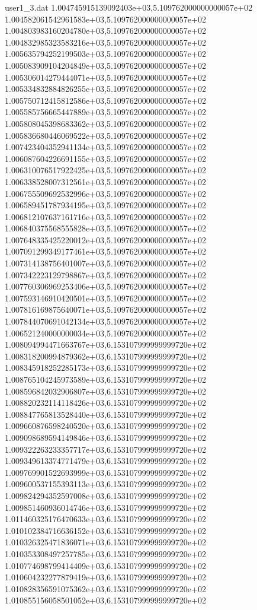 \begin{filecontents}{user1_3.dat}
1.004745915139092403e+03,5.109762000000000057e+02
1.004582061542961583e+03,5.109762000000000057e+02
1.004803983160204780e+03,5.109762000000000057e+02
1.004832985323583216e+03,5.109762000000000057e+02
1.005635794252199503e+03,5.109762000000000057e+02
1.005083909104204849e+03,5.109762000000000057e+02
1.005306014279444071e+03,5.109762000000000057e+02
1.005334832884826255e+03,5.109762000000000057e+02
1.005750712415812586e+03,5.109762000000000057e+02
1.005585756665447889e+03,5.109762000000000057e+02
1.005808045398683362e+03,5.109762000000000057e+02
1.005836680446069522e+03,5.109762000000000057e+02
1.007423404352941134e+03,5.109762000000000057e+02
1.006087604226691155e+03,5.109762000000000057e+02
1.006310076517922425e+03,5.109762000000000057e+02
1.006338528007312561e+03,5.109762000000000057e+02
1.006755509692532996e+03,5.109762000000000057e+02
1.006589451787934195e+03,5.109762000000000057e+02
1.006812107637161716e+03,5.109762000000000057e+02
1.006840375568555828e+03,5.109762000000000057e+02
1.007648335425220012e+03,5.109762000000000057e+02
1.007091299349177461e+03,5.109762000000000057e+02
1.007314138756401007e+03,5.109762000000000057e+02
1.007342223129798867e+03,5.109762000000000057e+02
1.007760306969253406e+03,5.109762000000000057e+02
1.007593146910420501e+03,5.109762000000000057e+02
1.007816169875640071e+03,5.109762000000000057e+02
1.007844070691042134e+03,5.109762000000000057e+02
1.006521240000000034e+03,5.109762000000000057e+02
1.008094994471663767e+03,6.153107999999999720e+02
1.008318200994879362e+03,6.153107999999999720e+02
1.008345918252285173e+03,6.153107999999999720e+02
1.008765104245973589e+03,6.153107999999999720e+02
1.008596842032906807e+03,6.153107999999999720e+02
1.008820232114118426e+03,6.153107999999999720e+02
1.008847765813528440e+03,6.153107999999999720e+02
1.009660876598240520e+03,6.153107999999999720e+02
1.009098689594149846e+03,6.153107999999999720e+02
1.009322263233357717e+03,6.153107999999999720e+02
1.009349613374771479e+03,6.153107999999999720e+02
1.009769901522693999e+03,6.153107999999999720e+02
1.009600537155393113e+03,6.153107999999999720e+02
1.009824294352597008e+03,6.153107999999999720e+02
1.009851460936014746e+03,6.153107999999999720e+02
1.011460325176470633e+03,6.153107999999999720e+02
1.010102384716636152e+03,6.153107999999999720e+02
1.010326325471836071e+03,6.153107999999999720e+02
1.010353308497257785e+03,6.153107999999999720e+02
1.010774698799414409e+03,6.153107999999999720e+02
1.010604232277879419e+03,6.153107999999999720e+02
1.010828356591075362e+03,6.153107999999999720e+02
1.010855156058501052e+03,6.153107999999999720e+02

\end{filecontents}
